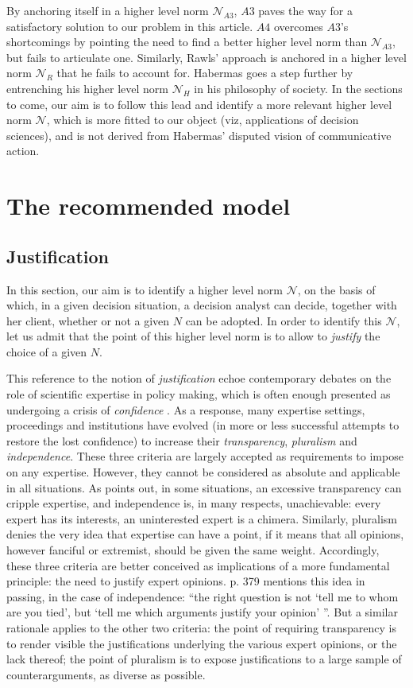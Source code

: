 \documentclass[preprint, french, english, 11pt, authoryear]{elsarticle}%
\newcommand{\adv}{\mathscr{N}}
\begin{document}
By anchoring itself in a higher level norm $\mathscr{N}_{A3}$, $A3$ paves the way for a satisfactory solution to our problem in this article. $A4$ overcomes $A3$'s shortcomings by pointing the need to find a better higher level norm than $\mathscr{N}_{A3}$, but fails to articulate one. Similarly, Rawls' approach is anchored in a higher level norm $\mathscr{N}_{R}$ that he fails to account for. Habermas goes a step further by entrenching his higher level norm $\mathscr{N}_{H}$ in his philosophy of society. In the sections to come, our aim is to follow this lead and identify a more relevant higher level norm $\adv$, which is more fitted to our object (viz, applications of decision sciences), and is not derived from Habermas' disputed vision of communicative action.

\section{The recommended model}
\subsection{Justification}
In this section, our aim is to identify a higher level norm $\adv$, on the basis of which, in a given decision situation, a decision analyst can decide, together with her client, whether or not a given $N$ can be adopted. In order to identify this $\adv$, let us admit that the point of this higher level norm is to allow to \emph{justify} the choice of a given $N$.

This reference to the notion of \emph{justification} echoe contemporary debates on the role of scientific expertise in policy making, which is often enough presented as undergoing a crisis of \emph{confidence} \citep{godard_environnement_2015}. As a response, many expertise settings, proceedings and institutions have evolved (in more or less successful attempts to restore the lost confidence) to increase their \emph{transparency}, \emph{pluralism} and \emph{independence}. These three criteria are largely accepted as requirements to impose on any expertise. However, they cannot be considered as absolute and applicable in all situations. As \citet{godard_environnement_2015} points out, in some situations, an excessive transparency can cripple expertise, and independence is, in many respects, unachievable: every expert has its interests, an uninterested expert is a chimera. Similarly, pluralism denies the very idea that expertise can have a point, if it means that all opinions, however fanciful or extremist, should be given the same weight. Accordingly, these three criteria are better conceived as implications of a more fundamental principle: the need to justify expert opinions. \citet{godard_environnement_2015} p. 379 mentions this idea in passing, in the case of independence: “the right question is not `tell me to whom are you tied', but `tell me which arguments justify your opinion' ”. But a similar rationale applies to the other two criteria: the point of requiring transparency is to render visible the justifications underlying the various expert opinions, or the lack thereof; the point of pluralism is to expose justifications to a large sample of counterarguments, as diverse as possible.
\end{document}
